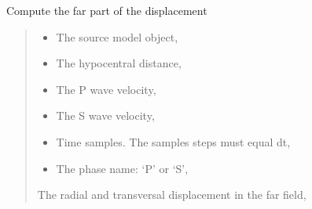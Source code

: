 \documentclass[letterpaper,10pt,english]{sphinxmanual}
\begin{document}
\begin{fulllineitems}
\begin{quote}
\begin{description}
\end{description}\end{quote}

\begin{fulllineitems}
\label{\detokenize{api_lib:green_functions.BaseGreenFunction.far}}
\pysigstartsignatures
{}
\pysigstopsignatures
\sphinxAtStartPar
Compute the far part of the displacement
\begin{quote}\begin{description}
\begin{itemize}
\item {} 
\sphinxAtStartPar
{} \textendash{} The source model object,

\item {} 
\sphinxAtStartPar
{} \textendash{} The hypocentral distance,

\item {} 
\sphinxAtStartPar
{} \textendash{} The P wave velocity,

\item {} 
\sphinxAtStartPar
{} \textendash{} The S wave velocity,

\item {} 
\sphinxAtStartPar
{} \textendash{} Time samples. The samples steps must equal dt,

\item {} 
\sphinxAtStartPar
{} \textendash{} The phase name: ‘P’ or ‘S’,

\end{itemize}

\sphinxAtStartPar
The radial and transversal displacement in the far field,


\end{description}
\end{quote}
\end{fulllineitems}
\end{fulllineitems}
\end{document}
